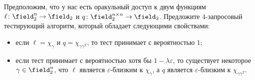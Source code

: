 Предположим, что у нас есть оракульный доступ к двум функциям $\ell\colon \field_2^n \to \field_2$ и
$q\colon \field_2^{n \times n} \to \field_2$. Предложите $4$-запросовый тестирующий алгоритм, который
обладает следующими свойствами:
\begin{itemize}
    \item если $\ell = \chi_{\gamma}$ и $q = \chi_{\gamma \gamma^T}$, то тест принимает с вероятностью
        $1$;
    \item если тест принимает с вероятностью хотя бы $1 - \lambda \varepsilon$, то существует некоторое
        $\gamma \in \field_2^n$, что $\ell$ является $\varepsilon$-близким к $\chi_\gamma$, а $q$
        является $\varepsilon$-близким к $\chi_{\gamma \gamma^T}$.
\end{itemize}